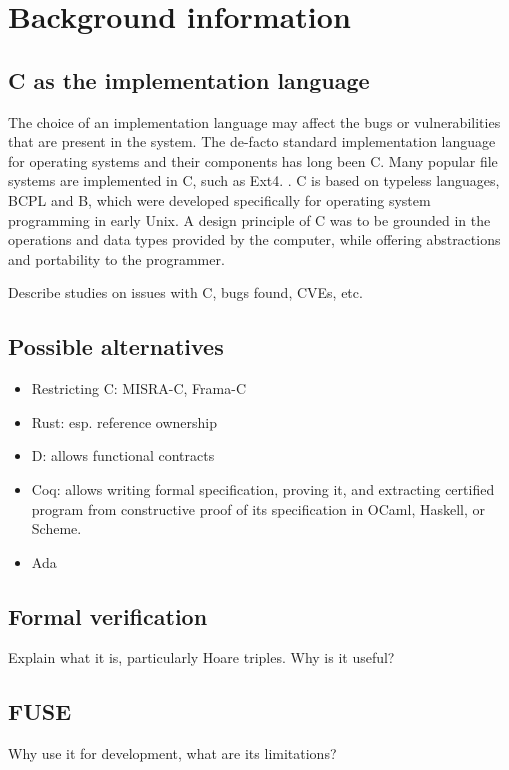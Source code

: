 \section{Background information}
\subsection{C as the implementation language}
The choice of an implementation language may affect the bugs or vulnerabilities that are present in the system.
The de-facto standard implementation language for operating systems and their components has long been C.
Many popular file systems are implemented in C, such as Ext4. \cite{ext4Source}.
C is based on typeless languages, BCPL and B, which were developed specifically for operating system programming in early Unix.
A design principle of C was to be grounded in the operations and data types provided by the computer, while offering abstractions and portability to the programmer. \cite{ritchie1993}

Describe studies on issues with C, bugs found, CVEs, etc.

\subsection{Possible alternatives}
\begin{itemize}
  \item Restricting C: MISRA-C, Frama-C
  \item Rust: esp. reference ownership
  \item D: allows functional contracts
  \item Coq: allows writing formal specification, proving it, and extracting certified program from constructive proof of its specification in OCaml, Haskell, or Scheme.
  \item Ada
\end{itemize}

\subsection{Formal verification}
Explain what it is, particularly Hoare triples.
Why is it useful?

\subsection{FUSE}
Why use it for development, what are its limitations?
